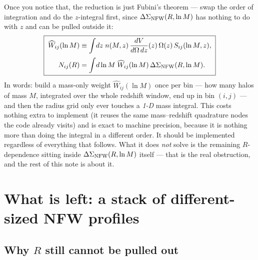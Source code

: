 \documentclass[a4paper, 11pt]{article}
\newcommand{\lnM}{\ln M}
\newcommand{\dVdz}{\dfrac{dV}{d\Omega\,dz}}
\newcommand{\DSnfw}{\Delta\Sigma_{\rm NFW}}
\begin{document}
Once you notice that, the reduction is just Fubini's theorem ---
swap the order of integration and do the $z$-integral first, since
$\DSnfw(R,\lnM)$ has nothing to do with $z$ and can be pulled
outside it:
\begin{equation}
\boxed{\;
\begin{aligned}
\widehat W_{ij}(\lnM) &\equiv \int\! dz\;
n(M,z)\,\dVdz(z)\,\Omega(z)\, S_{ij}(\lnM,z),\\[2pt]
N_{ij}(R) &= \int\! d\lnM\; \widehat W_{ij}(\lnM)\,\DSnfw(R,\lnM).
\end{aligned}
\;}
\label{eq:reduction}
\end{equation}
In words: build a mass-only weight $\widehat W_{ij}(\lnM)$ once per
bin --- how many halos of mass $M$, integrated over the whole
redshift window, end up in bin $(i,j)$ --- and then the radius grid
only ever touches a \emph{1-D} mass integral. This costs nothing
extra to implement (it reuses the same mass--redshift quadrature
nodes the code already visits) and is exact to machine precision,
because it is nothing more than doing the integral in a different
order. It should be implemented regardless of everything that
follows. What it does \emph{not} solve is the remaining
$R$-dependence sitting inside $\DSnfw(R,\lnM)$ itself --- that is
the real obstruction, and the rest of this note is about it.

\section{What is left: a stack of different-sized NFW profiles}
\label{sec:setup}

\subsection{Why \texorpdfstring{$R$}{R} still cannot be pulled out}
\end{document}
